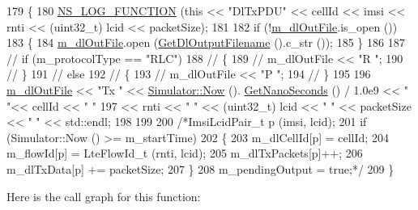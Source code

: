 \begin{DoxyCode}
179 \{
180   \hyperlink{log-macros-disabled_8h_a90b90d5bad1f39cb1b64923ea94c0761}{NS\_LOG\_FUNCTION} (\textcolor{keyword}{this} << \textcolor{stringliteral}{"DlTxPDU"} << cellId << imsi << rnti << (uint32\_t) lcid << 
      packetSize);
181 
182   \textcolor{keywordflow}{if} (!\hyperlink{classns3_1_1MmWaveBearerStatsCalculator_a99423ed4357c6877a7fade9e721d3b1f}{m\_dlOutFile}.is\_open ())
183   \{
184         \hyperlink{classns3_1_1MmWaveBearerStatsCalculator_a99423ed4357c6877a7fade9e721d3b1f}{m\_dlOutFile}.open (\hyperlink{classns3_1_1MmWaveBearerStatsCalculator_a9649a3b1ab4040cd1492d4e95c0117b4}{GetDlOutputFilename} ().c\_str ());
185   \}
186 
187   \textcolor{comment}{// if (m\_protocolType == "RLC")}
188   \textcolor{comment}{// \{}
189   \textcolor{comment}{//    m\_dlOutFile << "R ";}
190   \textcolor{comment}{// \}}
191   \textcolor{comment}{// else}
192   \textcolor{comment}{// \{}
193   \textcolor{comment}{//    m\_dlOutFile << "P ";}
194   \textcolor{comment}{// \}}
195 
196   \hyperlink{classns3_1_1MmWaveBearerStatsCalculator_a99423ed4357c6877a7fade9e721d3b1f}{m\_dlOutFile} << \textcolor{stringliteral}{"Tx "} << \hyperlink{classns3_1_1Simulator_ac3178fa975b419f7875e7105be122800}{Simulator::Now} ().
      \hyperlink{classns3_1_1Time_a2fdb7bf0e1f5cd93b6149cb37bbb7f08}{GetNanoSeconds} () / 1.0e9 << \textcolor{stringliteral}{" "}<< cellId << \textcolor{stringliteral}{" "}
197                 << rnti << \textcolor{stringliteral}{" "} << (uint32\_t) lcid << \textcolor{stringliteral}{" "} << packetSize << \textcolor{stringliteral}{" "} << std::endl;
198 
199 
200   \textcolor{comment}{/*ImsiLcidPair\_t p (imsi, lcid);}
201 \textcolor{comment}{  if (Simulator::Now () >= m\_startTime)}
202 \textcolor{comment}{    \{}
203 \textcolor{comment}{      m\_dlCellId[p] = cellId;}
204 \textcolor{comment}{      m\_flowId[p] = LteFlowId\_t (rnti, lcid);}
205 \textcolor{comment}{      m\_dlTxPackets[p]++;}
206 \textcolor{comment}{      m\_dlTxData[p] += packetSize;}
207 \textcolor{comment}{    \}}
208 \textcolor{comment}{  m\_pendingOutput = true;*/}
209 \}
\end{DoxyCode}


Here is the call graph for this function\+:


